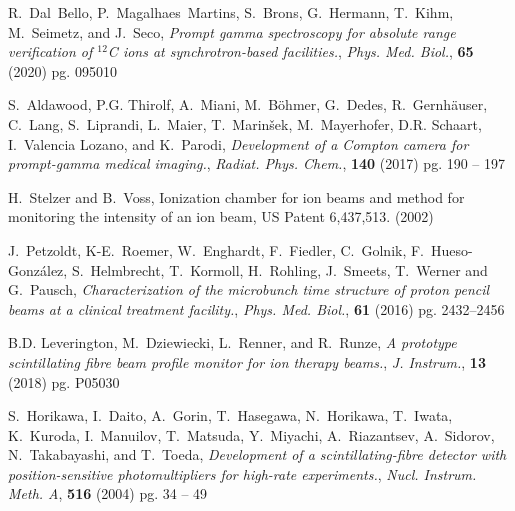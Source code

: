 \documentclass[a4paper,11pt]{article}
\begin{document}
\begin{thebibliography}{99}
R.~Dal~Bello, P.~Magalhaes~Martins, S.~Brons, G.~Hermann, T.~Kihm, M.~Seimetz, and J.~Seco, \emph{Prompt gamma spectroscopy for absolute range verification of $^{12}${C} ions at synchrotron-based facilities.}, \emph{Phys. Med. Biol.}, \textbf{65} (2020) pg. 095010

S.~Aldawood, P.G. Thirolf, A.~Miani, M.~Böhmer, G.~Dedes, R.~Gernhäuser,
  C.~Lang, S.~Liprandi, L.~Maier, T.~Marinšek, M.~Mayerhofer, D.R. Schaart,
  I.~Valencia Lozano, and K.~Parodi, \emph{Development of a {C}ompton camera for prompt-gamma medical imaging.}, \emph{Radiat. Phys. Chem.}, \textbf{140} (2017) pg. 190 -- 197

H.~Stelzer and B.~Voss, Ionization chamber for ion beams and method for monitoring the intensity of an ion beam, US Patent 6,437,513. (2002)

J.~Petzoldt, K-E.~Roemer, W.~Enghardt, F.~Fiedler, C.~Golnik, F.~Hueso-Gonz{\'{a}}lez, S.~Helmbrecht, T.~Kormoll, H.~Rohling, J.~Smeets, T.~Werner and G.~Pausch, \emph{Characterization of the microbunch time structure of proton pencil beams at a clinical treatment facility.}, \emph{Phys. Med. Biol.}, \textbf{61} (2016) pg. 2432--2456

B.D. Leverington, M.~Dziewiecki, L.~Renner, and R.~Runze, \emph{A prototype scintillating fibre beam profile monitor for ion therapy beams.}, \emph{J. Instrum.}, \textbf{13} (2018) pg. P05030

S.~Horikawa, I.~Daito, A.~Gorin, T.~Hasegawa, N.~Horikawa, T.~Iwata, K.~Kuroda,
  I.~Manuilov, T.~Matsuda, Y.~Miyachi, A.~Riazantsev, A.~Sidorov,
  N.~Takabayashi, and T.~Toeda, \emph{Development of a scintillating-fibre detector with position-sensitive photomultipliers for high-rate experiments.}, \emph{Nucl. Instrum. Meth. A}, \textbf{516} (2004) pg. 34
  -- 49


\end{thebibliography}
\end{document}
